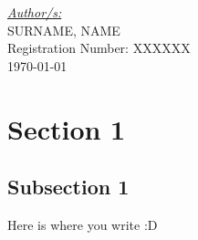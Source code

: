 \documentclass[12pt,a4paper, spanish]{article}
\begin{document}
\begin{titlepage}
    {\large\underline{\textit{Author/s:}}}\\[0.2cm]
       \textsc{SURNAME, NAME}\\
               Registration Number: XXXXXX\\[0.2cm]

    \vfill\vfill\vfill
    {\large\today}


\end{titlepage}


\newpage
\thispagestyle{empty}
\renewcommand*\contentsname{Index of contents}
\tableofcontents

\newpage
{}

\section{Section 1}
\subsection{Subsection 1}

Here is where you write :D
\end{document}
